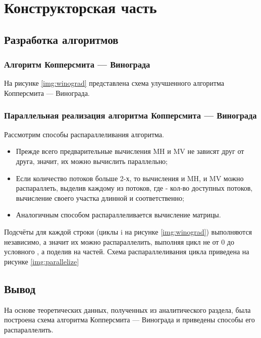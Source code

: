 \chapter{Конструкторская часть}

\section{Разработка алгоритмов}

\subsection{Алгоритм Копперсмита — Винограда}

На рисунке \ref{img:winograd} представлена схема улучшенного алгоритма Копперсмита — Винограда.


\subsection{Параллельная реализация алгоритма Копперсмита — Винограда}

Рассмотрим способы распараллеливания алгоритма.
\begin{itemize}
	\item Прежде всего предварительные вычисления MH и MV не зависят друг от друга, значит, их можно вычислить параллельно;
	\item Если количество потоков больше 2-х, то вычисления и MH, и MV можно распараллеть, выделив каждому из  потоков, где  - кол-во доступных потоков, вычисление своего участка длинной  и  соответственно;
	\item Аналогичным способом распараллеливается вычисление матрицы.
\end{itemize}

Подсчёты для каждой строки (циклы i на рисунке \ref{img:winograd}) выполняются независимо, а значит их можно распараллелить, выполняя цикл не от 0 до условного , а поделив  на  частей.
Схема распараллеливания цикла приведена на рисунке \ref{img:parallelize}


\section*{Вывод}

На основе теоретических данных, полученных из аналитического раздела, была построена схема алгоритма Копперсмита — Винограда и приведены способы его распараллелить.
